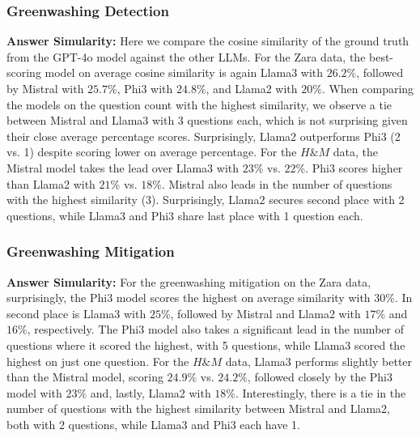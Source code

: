 \documentclass[]{article}
\begin{document}
\subsubsection{Greenwashing Detection}
\textbf{Answer Simularity:} Here we compare the cosine similarity of the ground truth from the GPT-4o model against the other LLMs.  
For the Zara data, the best-scoring model on average cosine similarity is again Llama3 with $26.2\%$, followed by Mistral with $25.7\%$, Phi3 with $24.8\%$, and Llama2 with $20\%$.  
When comparing the models on the question count with the highest similarity, we observe a tie between Mistral and Llama3 with 3 questions each, which is not surprising given their close average percentage scores. Surprisingly, Llama2 outperforms Phi3 (2 vs. 1) despite scoring lower on average percentage.\newline  
For the $H\&M$ data, the Mistral model takes the lead over Llama3 with $23\%$ vs. $22\%$. Phi3 scores higher than Llama2 with $21\%$ vs. $18\%$.  
Mistral also leads in the number of questions with the highest similarity (3). Surprisingly, Llama2 secures second place with 2 questions, while Llama3 and Phi3 share last place with 1 question each.

\subsubsection{Greenwashing Mitigation}
\textbf{Answer Simularity:} For the greenwashing mitigation on the Zara data, surprisingly, the Phi3 model scores the highest on average similarity with $30\%$. In second place is Llama3 with $25\%$, followed by Mistral and Llama2 with $17\%$ and $16\%$, respectively. The Phi3 model also takes a significant lead in the number of questions where it scored the highest, with 5 questions, while Llama3 scored the highest on just one question.\newline  
For the $H\&M$ data, Llama3 performs slightly better than the Mistral model, scoring $24.9\%$ vs. $24.2\%$, followed closely by the Phi3 model with $23\%$ and, lastly, Llama2 with $18\%$.  
Interestingly, there is a tie in the number of questions with the highest similarity between Mistral and Llama2, both with 2 questions, while Llama3 and Phi3 each have 1.
\end{document}

